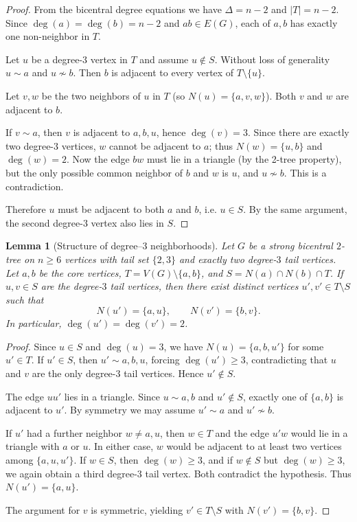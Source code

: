 \documentclass[12pt]{article}
\newtheorem{lemma}[theorem]{Lemma}
\numberwithin{equation}{section}
\begin{document}
\begin{proof}
From the bicentral degree equations we have $\Delta=n-2$ and $|T|=n-2$. 
Since $\deg(a)=\deg(b)=n-2$ and $ab\in E(G)$, each of $a,b$ has exactly 
one non-neighbor in $T$.

Let $u$ be a degree-$3$ vertex in $T$ and assume $u\notin S$. Without loss 
of generality $u\sim a$ and $u\not\sim b$. Then $b$ is adjacent to every 
vertex of $T\setminus\{u\}$.

Let $v,w$ be the two neighbors of $u$ in $T$ (so $N(u)=\{a,v,w\}$). 
Both $v$ and $w$ are adjacent to $b$. 

If $v\sim a$, then $v$ is adjacent to $a,b,u$, hence $\deg(v)=3$. 
Since there are exactly two degree-$3$ vertices, $w$ cannot be adjacent 
to $a$; thus $N(w)=\{u,b\}$ and $\deg(w)=2$. Now the edge $bw$ must lie in a triangle (by the 2-tree property), but the only possible common neighbor of $b$ and $w$ is $u$, and $u\not\sim b$. This is a contradiction.

Therefore $u$ must be adjacent to both $a$ and $b$, i.e. $u\in S$. 
By the same argument, the second degree-$3$ vertex also lies in $S$.
\end{proof}

\begin{lemma}[Structure of degree--$3$ neighborhoods]
\label{lem:deg3-structure}
Let $G$ be a strong bicentral $2$-tree on $n\ge 6$ vertices with tail set $\{2,3\}$
and exactly two degree-$3$ tail vertices.
Let $a,b$ be the core vertices,
$T=V(G)\setminus\{a,b\}$,
and $S=N(a)\cap N(b)\cap T$.
If $u,v\in S$ are the degree-$3$ tail vertices, then there exist distinct
vertices $u',v'\in T\setminus S$ such that
\[
N(u')=\{a,u\}, \qquad N(v')=\{b,v\}.
\]
In particular, $\deg(u')=\deg(v')=2$.
\end{lemma}

\begin{proof}
Since $u\in S$ and $\deg(u)=3$, we have $N(u)=\{a,b,u'\}$ for some $u'\in T$.
If $u'\in S$, then $u'\sim a,b,u$, forcing $\deg(u')\ge 3$, contradicting that
$u$ and $v$ are the only degree-$3$ tail vertices.
Hence $u'\notin S$.

The edge $uu'$ lies in a triangle.
Since $u\sim a,b$ and $u'\notin S$, exactly one of $\{a,b\}$ is adjacent to $u'$.
By symmetry we may assume $u'\sim a$ and $u'\not\sim b$.

If $u'$ had a further neighbor $w\neq a,u$, then $w\in T$ and the edge $u'w$
would lie in a triangle with $a$ or $u$.
In either case, $w$ would be adjacent to at least two vertices among
$\{a,u,u'\}$.
If $w\in S$, then $\deg(w)\ge 3$, and if $w\notin S$ but $\deg(w)\ge 3$,
we again obtain a third degree-$3$ tail vertex.
Both contradict the hypothesis.
Thus $N(u')=\{a,u\}$.

The argument for $v$ is symmetric, yielding $v'\in T\setminus S$ with
$N(v')=\{b,v\}$.
\end{proof}
\end{document}
